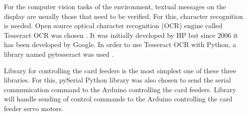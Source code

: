 For the computer vision tasks of the environment, textual messages on the display are usually those that need to be verified. For this, character recognition is needed. Open source optical character recognition (OCR) engine called Tesseract OCR was chosen \citep{tesseract}. It was initially developed by HP but since 2006 it has been developed by Google. In order to use Tesseract OCR with Python, a library named pytesseract was used \citep{pytesseract}.

Library for controlling the card feeders is the most simplest one of these three libraries. For this, pySerial Python library was also chosen to send the serial communication command to the Arduino controlling the card feeders. Library will handle sending of control commands to the Arduino controlling the card feeder servo motors.